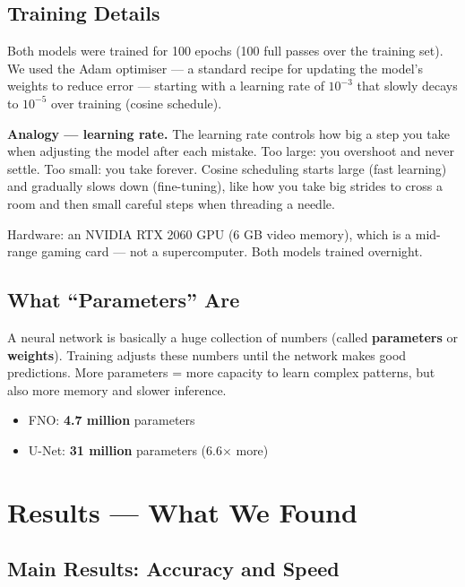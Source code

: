 \documentclass[11pt,twocolumn]{article}
\begin{document}
\subsection{Training Details}

Both models were trained for 100 epochs (100 full passes over the training set).
We used the Adam optimiser --- a standard recipe for updating the model's
weights to reduce error --- starting with a learning rate of $10^{-3}$ that
slowly decays to $10^{-5}$ over training (cosine schedule).

\begin{analogybox}
\textbf{Analogy --- learning rate.}
The learning rate controls how big a step you take when adjusting the model
after each mistake.
Too large: you overshoot and never settle.
Too small: you take forever.
Cosine scheduling starts large (fast learning) and gradually slows down
(fine-tuning), like how you take big strides to cross a room and then small
careful steps when threading a needle.
\end{analogybox}

Hardware: an NVIDIA RTX 2060 GPU (6 GB video memory), which is a mid-range
gaming card --- not a supercomputer.
Both models trained overnight.

\subsection{What ``Parameters'' Are}

A neural network is basically a huge collection of numbers (called
\textbf{parameters} or \textbf{weights}).
Training adjusts these numbers until the network makes good predictions.
More parameters = more capacity to learn complex patterns, but also more memory
and slower inference.

\begin{itemize}
  \item FNO: \textbf{4.7 million} parameters
  \item U-Net: \textbf{31 million} parameters (6.6$\times$ more)
\end{itemize}

\section{Results --- What We Found}

\subsection{Main Results: Accuracy and Speed}
\end{document}
